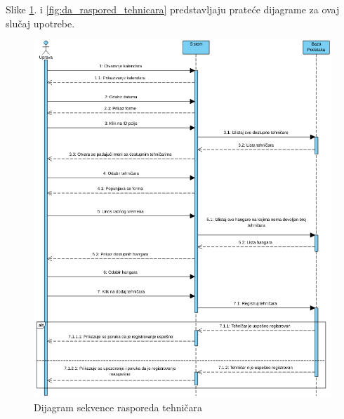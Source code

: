 \documentclass[a4paper]{article}
\begin{document}
Slike \ref{fig:ds_raspored_tehnicara}. i \ref{fig:da_raspored_tehnicara} predstavljaju prateće dijagrame za ovaj slučaj upotrebe.
\begin{figure}[H]
\begin{center}
\includegraphics[scale=0.5, width = 1.1\textwidth]{Dijagrami/Dijagrami_sekvence/Dijagram_sekvence_rasporeda_tehničara.png}
\end{center}
\caption{Dijagram sekvence rasporeda tehničara}
\label{fig:ds_raspored_tehnicara}
\end{figure}
\end{document}
